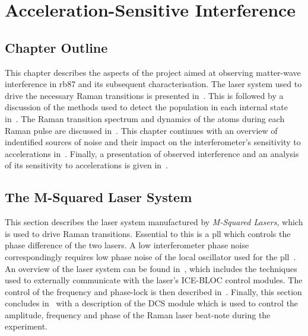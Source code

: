 \chapter{Acceleration-Sensitive Interference}\label{chap:atom_int}

\section{Chapter Outline}
This chapter describes the aspects of the project aimed at observing
matter-wave interference in \ac{rb87} and its subsequent
characterisation. The laser system used to drive the necessary Raman
transitions is presented in~. This is
followed by a discussion of the methods used to detect the population
in each internal state in~. The Raman
transition spectrum and
dynamics of the atoms during each Raman pulse are discussed
in~. This chapter continues
with an overview of indentified sources of noise and their impact on
the interferometer's sensitivity to accelerations
in~. Finally, a presentation of observed
interference and an analysis of its sensitivity to accelerations is
given in~.
\section{The M-Squared Laser System}\label{sec:msquared_laser} 
  This section describes the laser system manufactured by \textit{M-Squared
  Lasers}, which is used to drive Raman transitions. Essential to this
  is a \ac{pll} which controls the phase difference of the two lasers.
  A low interferometer phase noise correspondingly requires low phase
  noise of the local oscillator used for the
  \ac{pll}~\cite{Lautier2014b}\nocite{Marino2008}. An overview of the laser
  system can be found in~, which includes
  the techniques used to externally communicate with the laser's ICE-BLOC
  control modules. The control of the frequency and phase-lock is then described
  in~. Finally, this section concludes
  in~ with a description of the DCS
  module which is used to control
  the amplitude, frequency and phase of the Raman laser beat-note
  during the experiment.
